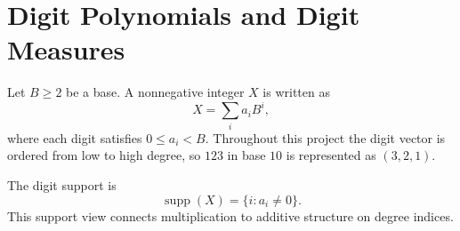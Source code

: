 \section{Digit Polynomials and Digit Measures}

Let $B \ge 2$ be a base. A nonnegative integer $X$ is written as
\[
  X = \sum_i a_i B^i,
\]
where each digit satisfies $0 \le a_i < B$. Throughout this project the digit
vector is ordered from low to high degree, so $123$ in base $10$ is represented
as $(3,2,1)$.

The digit support is
\[
  \operatorname{supp}(X) = \{i : a_i \ne 0\}.
\]
This support view connects multiplication to additive structure on degree
indices.
